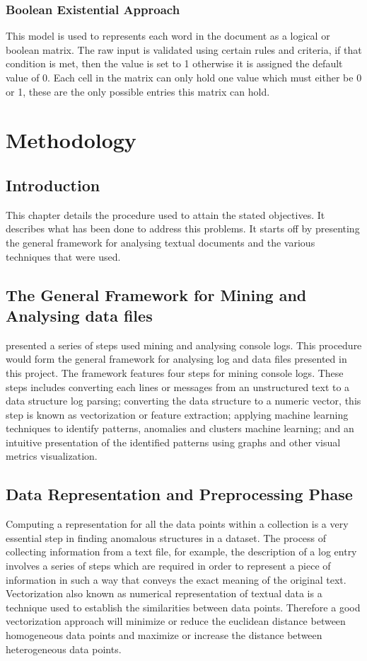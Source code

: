 \documentclass[12pt, letterpaper, titlepage]{report}
\begin{document}
\subsection{Boolean Existential Approach}
This model is used to represents each word in the document as a logical or boolean matrix. The raw input is validated using certain rules and criteria, if that condition is met, then the value is set to 1 otherwise it is assigned the default value of 0. Each cell in the matrix can only hold one value which must either be 0 or 1, these are the only possible entries this matrix can hold.

\newpage
\chapter{Methodology}

\section{Introduction}
This chapter details the procedure used to attain the stated objectives. It describes what has been done to address this problems. It starts off by presenting the general framework for analysing textual documents and the various techniques that were used.

\section{The General Framework for Mining and Analysing data files}
\cite{xu2010system} presented a series of steps used mining and analysing console logs. This procedure would form the general framework for analysing log and data files presented in this project. The framework features four steps for mining console logs. These steps includes converting each lines or messages from an unstructured text to a data structure log parsing; converting the data structure to a numeric vector, this step is known as vectorization or feature extraction; applying machine learning techniques to identify patterns, anomalies and clusters machine learning; and an intuitive presentation of the identified patterns using graphs and other visual metrics visualization.


\section{Data Representation and Preprocessing Phase}

Computing a representation for all the data points within a collection is a very essential step in finding anomalous structures in a dataset. The process of collecting information from a text file, for example, the description of a log entry involves a series of steps which are required in order to represent a piece of information in such a way that conveys the exact meaning of the original text.
Vectorization also known as numerical representation of textual data is a technique used to establish the similarities between data points. Therefore a good vectorization approach will minimize or reduce the euclidean distance between homogeneous data points and maximize or increase the distance between heterogeneous data points. 
\end{document}
